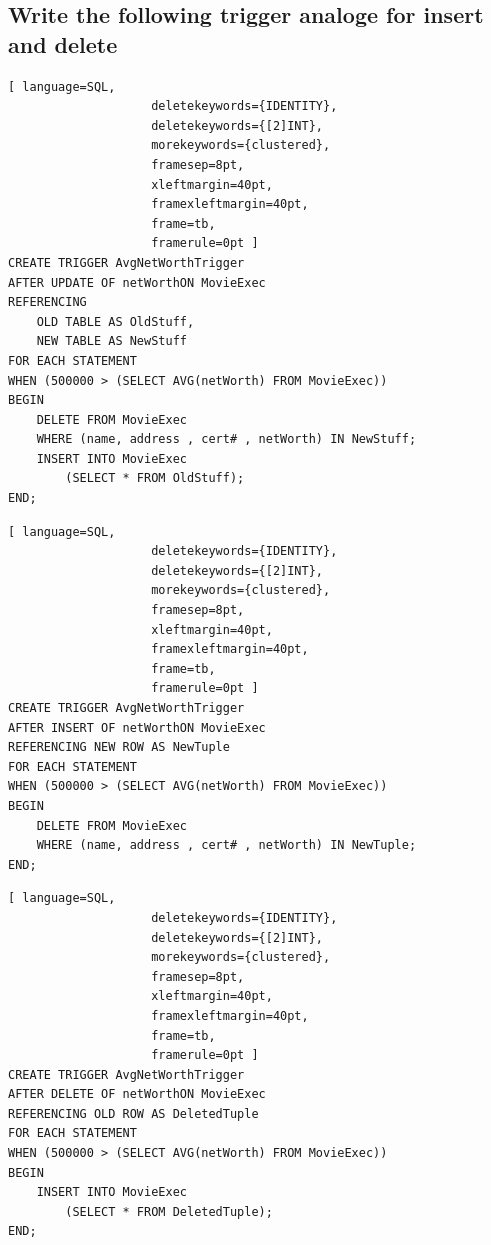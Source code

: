 \documentclass[12pt, a4paper]{article}
\newcommand{\beginSQL}{\begin{lstlisting}[ language=SQL,
                    deletekeywords={IDENTITY},
                    deletekeywords={[2]INT},
                    morekeywords={clustered},
                    framesep=8pt,
                    xleftmargin=40pt,
                    framexleftmargin=40pt,
                    frame=tb,
                    framerule=0pt ]}
\begin{document}
			\subsection{Write the following trigger analoge for insert and delete}	
				\beginSQL
CREATE TRIGGER AvgNetWorthTrigger
AFTER UPDATE OF netWorthON MovieExec
REFERENCING
	OLD TABLE AS OldStuff,
	NEW TABLE AS NewStuff
FOR EACH STATEMENT
WHEN (500000 > (SELECT AVG(netWorth) FROM MovieExec))
BEGIN
	DELETE FROM MovieExec
	WHERE (name, address , cert# , netWorth) IN NewStuff;
	INSERT INTO MovieExec
		(SELECT * FROM OldStuff);
END;
				\end{lstlisting}
				\beginSQL
CREATE TRIGGER AvgNetWorthTrigger
AFTER INSERT OF netWorthON MovieExec
REFERENCING NEW ROW AS NewTuple
FOR EACH STATEMENT
WHEN (500000 > (SELECT AVG(netWorth) FROM MovieExec))
BEGIN
	DELETE FROM MovieExec
	WHERE (name, address , cert# , netWorth) IN NewTuple;
END;
				\end{lstlisting}
				\beginSQL
CREATE TRIGGER AvgNetWorthTrigger
AFTER DELETE OF netWorthON MovieExec
REFERENCING OLD ROW AS DeletedTuple
FOR EACH STATEMENT
WHEN (500000 > (SELECT AVG(netWorth) FROM MovieExec))
BEGIN
	INSERT INTO MovieExec
		(SELECT * FROM DeletedTuple);
END;
				\end{lstlisting}
				
				
\end{document}
